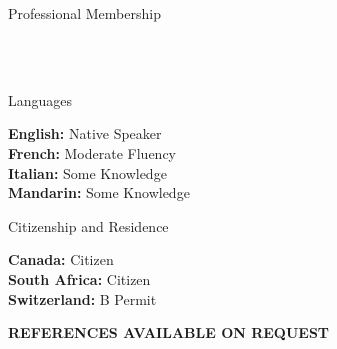 \documentclass{cv}
\begin{document}

\begin{rSection}{Professional Membership}

 \\
 \\

\end{rSection}


\begin{rSection}{Languages}

{\bf English:} Native Speaker \vspace{0.2em}\\
{\bf French:} Moderate Fluency \vspace{0.2em}\\
{\bf Italian:} Some Knowledge \vspace{0.2em}\\
{\bf Mandarin:} Some Knowledge

\end{rSection}


\begin{rSection}{Citizenship and Residence}

{\bf Canada:} Citizen \vspace{0.2em}\\
{\bf South Africa:} Citizen \vspace{0.2em}\\
{\bf Switzerland:} B Permit

\end{rSection}


\vspace{1em}
\begin{center}
    \large{\MakeUppercase{\bf References Available On Request}}
\end{center}
\end{document}
